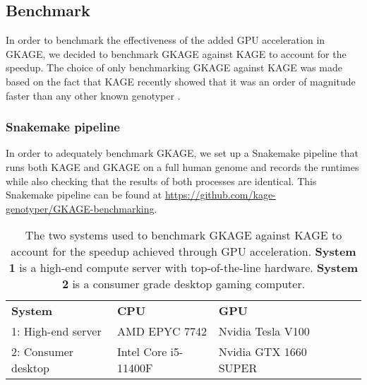 \subsection{Benchmark} \label{results:benchmark}
In order to benchmark the effectiveness of the added GPU acceleration in GKAGE, we decided to benchmark GKAGE against KAGE to account for the speedup.
The choice of only benchmarking GKAGE against KAGE was made based on the fact that KAGE recently showed that it was an order of magnitude faster than any other known genotyper \cite{kage}.

\subsubsection{Snakemake pipeline}
In order to adequately benchmark GKAGE, we set up a Snakemake pipeline that runs both KAGE and GKAGE on a full human genome and records the runtimes while also checking that the results of both processes are identical.
This Snakemake pipeline can be found at \url{https://github.com/kage-genotyper/GKAGE-benchmarking}.

\begin{table}[H]
\begin{tabular}{lllll}
\cline{1-3}
\multicolumn{1}{|l|}{\textbf{System}} & \multicolumn{1}{l|}{\textbf{CPU}}                  & \multicolumn{1}{l|}{\textbf{GPU}}                   &  \\ \cline{1-3}
\multicolumn{1}{|l|}{1: High-end server} & \multicolumn{1}{l|}{AMD EPYC 7742}        & \multicolumn{1}{l|}{Nvidia Tesla V100}     &  \\ \cline{1-3}
\multicolumn{1}{|l|}{2: Consumer desktop} & \multicolumn{1}{l|}{Intel Core i5-11400F} & \multicolumn{1}{l|}{Nvidia GTX 1660 SUPER} &  \\ \cline{1-3}
\end{tabular}
\caption{
  The two systems used to benchmark GKAGE against KAGE to account for the speedup achieved through GPU acceleration.
  \textbf{System 1} is a high-end compute server with top-of-the-line hardware.
  \textbf{System 2} is a consumer grade desktop gaming computer.
}
\label{results:gkage:tables:systems}
\end{table}
